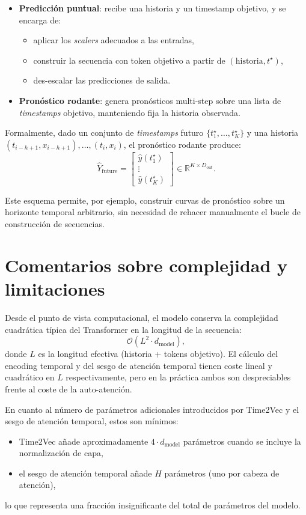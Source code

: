 \begin{itemize}
    \item \textbf{Predicción puntual}: recibe una historia y un timestamp objetivo, y se encarga de:
    \begin{itemize}
        \item aplicar los \emph{scalers} adecuados a las entradas,
        \item construir la secuencia con token objetivo a partir de $(\text{historia}, t^\star)$,
        \item des-escalar las predicciones de salida.
    \end{itemize}
    \item \textbf{Pronóstico rodante}: genera pronósticos multi-step sobre una lista de \emph{timestamps} objetivo, manteniendo fija la historia observada.
\end{itemize}

Formalmente, dado un conjunto de \emph{timestamps} futuro $\{t^{\star}_1,\dots,t^{\star}_K\}$ y una historia $(t_{i-h+1}, x_{i-h+1}),\dots,(t_i, x_i)$, el pronóstico rodante produce:
\[
    \hat{Y}_{\text{future}} =
    \begin{bmatrix}
        \hat{y}(t^{\star}_1) \\
        \vdots \\
        \hat{y}(t^{\star}_K)
    \end{bmatrix}
    \in \mathbb{R}^{K \times D_{\text{out}}}.
\]

Este esquema permite, por ejemplo, construir curvas de pronóstico sobre un horizonte temporal arbitrario, sin necesidad de rehacer manualmente el bucle de construcción de secuencias.

\section{Comentarios sobre complejidad y limitaciones}
\label{sec:complejidad-limitaciones}

Desde el punto de vista computacional, el modelo conserva la complejidad cuadrática típica del Transformer en la longitud de la secuencia:
\[
    \mathcal{O}(L^2 \cdot d_{\text{model}}),
\]
donde $L$ es la longitud efectiva (historia + tokens objetivo). El cálculo del encoding temporal y del sesgo de atención temporal tienen coste lineal y cuadrático en $L$ respectivamente, pero en la práctica ambos son despreciables frente al coste de la auto-atención.

En cuanto al número de parámetros adicionales introducidos por Time2Vec y el sesgo de atención temporal, estos son mínimos:
\begin{itemize}
    \item Time2Vec añade aproximadamente $4 \cdot d_{\text{model}}$ parámetros cuando se incluye la normalización de capa,
    \item el sesgo de atención temporal añade $H$ parámetros (uno por cabeza de atención),
\end{itemize}
lo que representa una fracción insignificante del total de parámetros del modelo.

